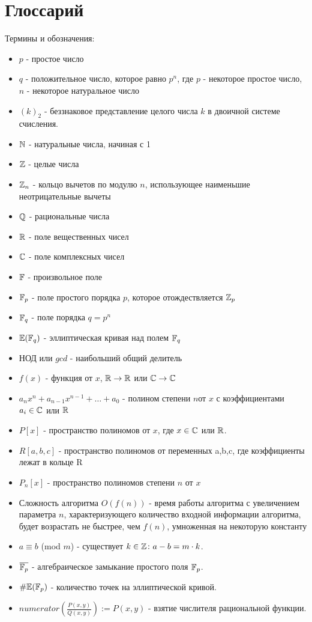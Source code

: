 \documentclass{article}
\begin{document}
\section{Глоссарий}\label{glossary}
Термины и обозначения:
\begin{itemize}
  \item $p$ - простое число
  \item $q$ - положительное число, которое равно $p^n$, где $p$ - некоторое простое число, $n$ - некоторое натуральное число
  \item $(k)_2$ - беззнаковое представление целого числа $k$ в двоичной системе счисления.
  \item $\mathbb{N}$ - натуральные числа, начиная с 1
  \item $\mathbb{Z}$ - целые числа
  \item $\mathbb{Z}_n$ - кольцо вычетов по модулю $n$, использующее наименьшие неотрицательные вычеты
  \item $\mathbb{Q}$ - рациональные числа
  \item $\mathbb{R}$ - поле вещественных чисел 
  \item $\mathbb{C}$ - поле комплексных чисел
  \item $\mathbb{F}$ - произвольное поле
  \item $\mathbb{F}_p$ - поле простого порядка $p$, которое отождествляется $\mathbb{Z}_p$ 
  \item $\mathbb{F}_q$ - поле порядка $q=p^n$ 
  \item $\mathbb{E}(\mathbb{F}_q)$ - эллиптическая кривая над полем $\mathbb{F}_q$

  \item НОД или $gcd$ - наибольший общий делитель
  \item $f(x)$ - функция от $x$, $\mathbb{R}\to\mathbb{R}$ или $\mathbb{C}\to\mathbb{C}$ 
  \item $a_nx^n+a_{n-1}x^{n-1}+\dots+a_0$ - полином степени $n $от $x$ с коэффициентами $a_i\in\mathbb{C}$ или $\mathbb{R}$
  \item $P[x]$ - пространство полиномов от $x$, где $x\in\mathbb{C}$ или $\mathbb{R}$. 
  \item $R[a,b,c]$ - пространство полиномов от переменных a,b,c, где коэффициенты лежат в кольце R
  \item $P_n[x]$ - пространство полиномов степени $n$ от $x$
  \item Сложность алгоритма $O(f(n))$ - время работы алгоритма с увеличением параметра $n$, характеризующего количество входной информации алгоритма, будет возрастать не быстрее, чем $f(n)$, умноженная на некоторую константу

  \item $a\equiv b$ (mod $m$) - существует $k\in\mathbb{Z}\colon a - b = m\cdot k$. 
  \item $\overline{\mathbb{F}_p}$ - алгебраическое замыкание простого поля $\mathbb{F}_p$.
  \item $\#\mathbb{E}(\mathbb{F}_p)$ - количество точек на эллиптической кривой. 
  \item $numerator \left(\frac{P(x,y)}{Q(x,y)}\right):= P(x,y)$ - взятие числителя рациональной функции. 
\end{itemize}
\end{document}
